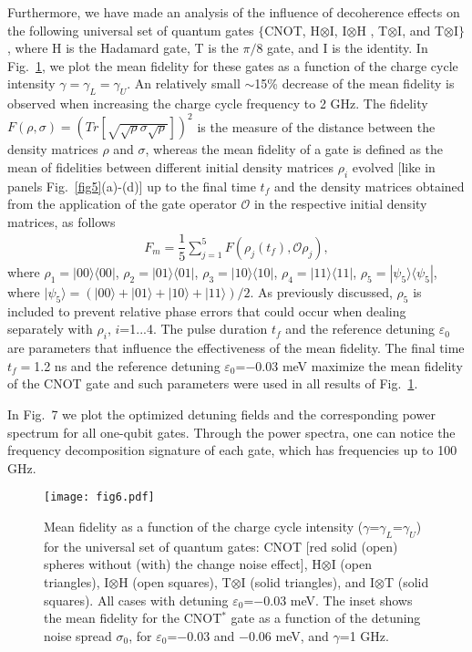 \documentclass[prb,twocolumn,showpacs,floats]{revtex4}
\begin{document}
Furthermore, we have made an analysis of the influence of decoherence effects on the following  universal set of quantum gates $\{$CNOT, H$\otimes$I, I$\otimes$H , T$\otimes$I, and T$\otimes$I$\}$, where H is the Hadamard gate, T is the $\pi/8$ gate, and I is the identity. In Fig.~\ref{fig6}, we plot the mean fidelity for these gates as a function of the charge cycle intensity $\gamma=\gamma_L=\gamma_U$. 
An relatively small $\sim$15\% decrease of the mean fidelity is observed when increasing the charge cycle frequency to 2 GHz.
The fidelity $F(\rho,\sigma)=(Tr\left[\sqrt{\sqrt{\rho}\sigma\sqrt{\rho}}\right])^2$ is the measure of the distance between the density matrices $\rho$ and $\sigma$, whereas the mean fidelity of a gate is defined as the mean of fidelities between different initial density matrices $\rho_i$ evolved [like in panels Fig.~\ref{fig5}(a)-(d)] up to the final time $t_f$ and the density matrices obtained from the application of the gate operator $\mathcal{O}$ in the respective initial density matrices, as follows
\begin{eqnarray}
F_m=\dfrac{1}{5}\sum_{j=1}^{5}F\left(\rho_j(t_f),\mathcal{O}\rho_j\right),
\end{eqnarray} 
where  $\rho_1=|00\rangle\langle00|$, $\rho_2=|01\rangle\langle01|$, $\rho_3=|10\rangle\langle10|$, $\rho_4=|11\rangle\langle11|$, $\rho_5=|\psi_5\rangle\langle\psi_5|$, where $|\psi_5\rangle=\left(|00\rangle+|01\rangle+|10\rangle+|11\rangle\right)/2$. As previously discussed, $\rho_5$ is included to prevent relative phase errors
that could occur when dealing separately with $\rho_i$, $i$=1...4.
The pulse duration $t_f$ and the reference detuning $\varepsilon_0$ are parameters that influence the effectiveness of the mean fidelity. The final time $t_f=$1.2 ns and the reference detuning $\varepsilon_0$=$-$0.03 meV maximize the mean fidelity of the CNOT gate and such parameters were used in all results of Fig.~\ref{fig6}.  

In Fig.~7 we plot the optimized detuning fields and the corresponding power spectrum for all one-qubit gates. Through the power spectra, one can notice the frequency decomposition signature of each gate, which has frequencies up to 100 GHz.

\begin{figure}[htbp]
\texttt{[image: fig6.pdf]} 
\caption{Mean fidelity as a function of the charge cycle intensity 
($\gamma$=$\gamma_L$=$\gamma_U$)
for the universal set of quantum gates: CNOT [red solid (open) spheres without (with) the change noise effect], H$\otimes$I (open triangles), I$\otimes$H (open squares), T$\otimes$I (solid triangles), and I$\otimes$T (solid squares). All cases with detuning $\varepsilon_0$=$-$0.03 meV.
The inset shows the mean fidelity for the CNOT$^*$ gate as a function of the detuning noise spread
$\sigma_0$, for $\varepsilon_0$=$-$0.03 and $-$0.06 meV, and $\gamma$=1 GHz.}
\label{fig6}
\end{figure}
\end{document}
